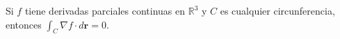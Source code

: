 \item Si $f$ tiene derivadas parciales continuas en $\mathbb{R}^3$ y $C$ es cualquier circunferencia, entonces $\int_C \nabla f \cdot d\mathbf{r} = 0$.
